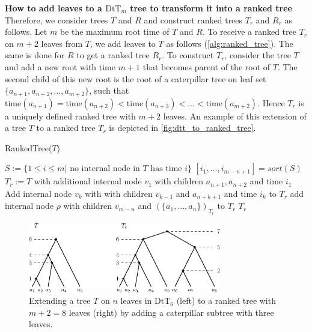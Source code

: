 \documentclass[11pt]{amsart}
\newcommand{\ntime}{\mathrm{time}}
\newcommand{\dtt}{\mathrm{DtT}}
\newcommand{\summary}[1]{\textbf{#1}} %
\begin{document}
\summary{How to add leaves to a $\dtt_m$ tree to transform it into a ranked tree}
Therefore, we consider trees $T$ and $R$ and construct ranked trees $T_r$ and $R_r$ as follows.
Let $m$ be the maximum root time of $T$ and $R$.
To receive a ranked tree $T_r$ on $m+2$ leaves from $T$, we add leaves to $T$ as follows (\autoref{alg:ranked_tree}).
The same is done for $R$ to get a ranked tree $R_r$.
To construct $T_r$, consider the tree $T$ and add a new root with time $m + 1$ that becomes parent of the root of $T$.
The second child of this new root is the root of a caterpillar tree on leaf set $\{a_{n+1}, a_{n+2}, \ldots, a_{m+2}\}$, such that $\ntime(a_{n+1}) = \ntime(a_{n+2}) < \ntime(a_{n+3}) < \ldots < \ntime(a_{m+2})$.
Hence $T_r$ is a uniquely defined ranked tree with $m+2$ leaves.
An example of this extension of a tree $T$ to a ranked tree $T_r$ is depicted in \autoref{fig:dtt_to_ranked_tree}.

\begin{algorithm}[ht]
	\caption{RankedTree($T$)}
	\label{alg:ranked_tree}
	\begin{algorithmic}[1]
		\STATE $S:= \{1 \leq i \leq m | \text{ no internal node in } T \text{ has time } i\}$
		\STATE $[i_1, \ldots, i_{m-n+1}] = sort(S)$
		\STATE $T_r := T$ with additional internal node $v_1$ with children $a_{n+1}, a_{n+2}$ and time $i_1$
			\STATE Add internal node $v_k$ with with children $v_{k-1}$ and $a_{n+k+1}$ and time $i_k$ to $T_r$
		\STATE add internal node $\rho$ with children $v_{m-n}$ and $(\{a_1, \ldots, a_n\})_{T_r}$ to $T_r$
		\ENDFOR
		\RETURN $T_r$
	\end{algorithmic}
\end{algorithm}

\begin{figure}[ht]
	\includegraphics[width=0.75\textwidth]{dtt_to_ranked_tree.eps}
	\caption{Extending a tree $T$ on $n$ leaves in $\dtt_6$ (left) to a ranked tree with $m+2=8$ leaves (right) by adding a caterpillar subtree with three leaves.}
	\label{fig:dtt_to_ranked_tree}
\end{figure}
\end{document}
